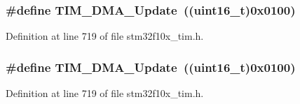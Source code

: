 \subsubsection[{\texorpdfstring{T\+I\+M\+\_\+\+D\+M\+A\+\_\+\+Update}{TIM_DMA_Update}}]{\setlength{\rightskip}{0pt plus 5cm}\#define T\+I\+M\+\_\+\+D\+M\+A\+\_\+\+Update~(({\bf uint16\+\_\+t})0x0100)}\hypertarget{group___t_i_m___d_m_a__sources_ga013a49e5cceb263f01941aef968dea9c}{}\label{group___t_i_m___d_m_a__sources_ga013a49e5cceb263f01941aef968dea9c}


Definition at line 719 of file stm32f10x\+\_\+tim.\+h.

\subsubsection[{\texorpdfstring{T\+I\+M\+\_\+\+D\+M\+A\+\_\+\+Update}{TIM_DMA_Update}}]{\setlength{\rightskip}{0pt plus 5cm}\#define T\+I\+M\+\_\+\+D\+M\+A\+\_\+\+Update~(({\bf uint16\+\_\+t})0x0100)}\hypertarget{group___t_i_m___d_m_a__sources_ga013a49e5cceb263f01941aef968dea9c}{}\label{group___t_i_m___d_m_a__sources_ga013a49e5cceb263f01941aef968dea9c}


Definition at line 719 of file stm32f10x\+\_\+tim.\+h.

